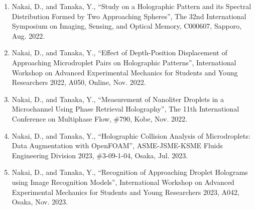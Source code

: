 \begin{enumerate}
\renewcommand{\labelenumi}{(\arabic{enumi})}
    \item Nakai, D., and Tanaka, Y., “Study on a Holographic Pattern and its Spectral Distribution Formed by Two Approaching Spheres”, The 32nd International Symposium on Imaging, Sensing, and Optical Memory, C000607, Sapporo, Aug. 2022.
    \item Nakai, D., and Tanaka, Y., “Effect of Depth-Position Displacement of Approaching Microdroplet Pairs on Holographic Patterns”, International Workshop on Advanced Experimental Mechanics for Students and Young Researchers 2022, A050, Online, Nov. 2022.
    \item Nakai, D., and Tanaka, Y., “Measurement of Nanoliter Droplets in a Microchannel Using Phase Retrieval Holography”, The 11th International Conference on Multiphase Flow, \#790, Kobe, Nov. 2022.
    \item Nakai, D., and Tanaka, Y., “Holographic Collision Analysis of Microdroplets: Data Augmentation with OpenFOAM”, ASME-JSME-KSME Fluids Engineering Division 2023, \#3-09-1-04, Osaka, Jul. 2023.
    \item Nakai, D., and Tanaka, Y., “Recognition of Approaching Droplet Holograms using Image Recognition Models”, International Workshop on Advanced Experimental Mechanics for Students and Young Researchers 2023, A042, Osaka, Nov. 2023.
\end{enumerate}

